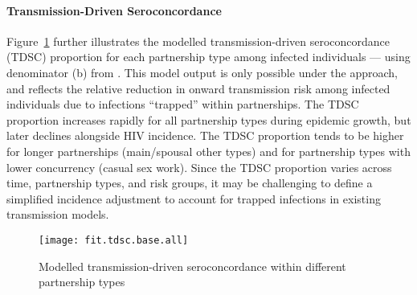\paragraph{Transmission-Driven Seroconcordance}
Figure~\ref{fig:fit.tdsc.foi} further illustrates the modelled
transmission-driven seroconcordance (TDSC) proportion for each partnership type
among infected individuals --- \ie using denominator (b) from .
This model output is only possible under the \epa approach, and reflects
the relative reduction in onward transmission risk among infected individuals
due to infections ``trapped'' within partnerships.
The TDSC proportion increases rapidly for all partnership types during epidemic growth,
but later declines alongside HIV incidence.
The TDSC proportion tends to be higher for
longer partnerships (\eg main/spousal \vs other types) and for
partnership types with lower concurrency (\eg casual \vs sex work).
Since the TDSC proportion varies across time, partnership types, and risk groups,
it may be challenging to define a simplified incidence adjustment
to account for trapped infections in existing transmission models.
\begin{figure}
  \centering\texttt{[image: fit.tdsc.base.all]}
  \caption{Modelled transmission-driven seroconcordance within different partnership types}
  \label{fig:fit.tdsc.foi}
\end{figure}
